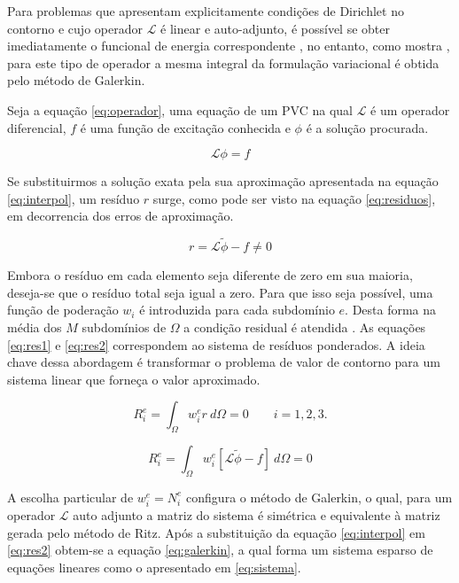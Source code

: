 \documentclass[
    12pt,               %
    openright,          %
    oneside,
    a4paper,            %
    english,            %
    french,             %
    spanish,            %
    brazil              %
    ]{abntex2}
\begin{document}
Para problemas que apresentam explicitamente condições de Dirichlet no contorno e cujo operador $\mathcal{L}$ é linear e auto-adjunto, é possível se obter imediatamente o funcional de energia correspondente \cite{zien}, no entanto, como mostra \cite[p. 29]{volakis}, para este tipo de operador a mesma integral da formulação variacional é obtida pelo método de Galerkin.


Seja a equação \ref{eq:operador}, uma equação de um PVC na qual $\mathcal{L}$ é um operador diferencial, $f$ é uma função de excitação conhecida e $\phi$ é a solução procurada.

\begin{equation}
\label{eq:operador}
\mathcal{L} \phi = f
\end{equation}

Se substituirmos a solução exata pela sua aproximação apresentada na equação \ref{eq:interpol}, um resíduo $r$ surge, como pode ser visto na equação \ref{eq:residuos}, em decorrencia dos erros de aproximação.

\begin{equation}
\label{eq:residuos}
r = \mathcal{L} \tilde{\phi} - f \neq 0
\end{equation}

Embora o resíduo em cada elemento seja diferente de zero em sua maioria, deseja-se que o resíduo total seja igual a zero. Para que isso seja possível, uma função de poderação $w_i$ é introduzida para cada subdomínio $e$. Desta forma na média dos $M$ subdomínios de $\Omega$ a condição residual é atendida \cite{volakis}.
As equações \ref{eq:res1} e \ref{eq:res2} correspondem ao sistema de resíduos ponderados. A ideia chave dessa abordagem é transformar o problema de valor de contorno para um sistema linear que forneça o valor aproximado. 

\begin{equation}
\label{eq:res1}
R_i^e = \int_{\Omega}{w_i^e r \ d\Omega} = 0 \qquad i = 1,2,3.
\end{equation}

\begin{equation}
\label{eq:res2}
R_i^e = \int_{\Omega}{w_i^e [\mathcal{L} \tilde{\phi} - f] \ d\Omega} = 0
\end{equation}  


A escolha particular de $w_i^e = N^e_i$ configura o método de Galerkin, o qual, para um operador $\mathcal{L}$ auto adjunto a matriz do sistema é simétrica e equivalente à matriz gerada pelo método de Ritz. Após a substituição da equação \ref{eq:interpol} em \ref{eq:res2} obtem-se a equação \ref{eq:galerkin}, a qual forma um sistema esparso de equações lineares como o apresentado em \ref{eq:sistema}.
\end{document}
